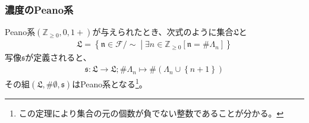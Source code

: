 \documentclass[dvipdfmx]{jsarticle}
\begin{document}
\subsubsection{濃度のPeano系}%
\begin{thm}\label{1.2.8.11}
Peano系$\left( \mathbb{Z}_{\geq 0},0,1 + \right)$が与えられたとき、次式のように集合$\mathfrak{L}$と
\begin{align*}
\mathfrak{L} =\left\{ \mathfrak{n \in}\mathcal{F} /\sim \middle| \exists n \in \mathbb{Z}_{\geq 0}\left[ \mathfrak{n} =\# \varLambda_{n} \right] \right\}
\end{align*}
写像$\mathfrak{s}$が定義されると、
\begin{align*}
\mathfrak{s:L \rightarrow L;}\# \varLambda_{n} \mapsto \# \left( \varLambda_{n} \cup \left\{ n + 1 \right\} \right)
\end{align*}
その組$\left( \mathfrak{L,}\# \emptyset ,\mathfrak{s} \right)$はPeano系となる\footnote{この定理により集合の元の個数が負でない整数であることが分かる。}。
\end{thm}
\end{document}
